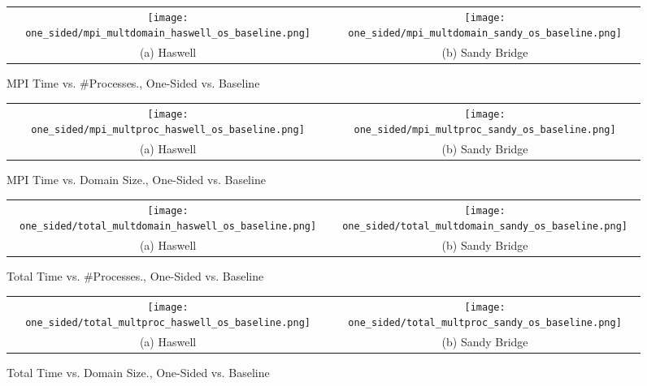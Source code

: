 \begin{enumerate}
		\begin{figure}[h] %
		\hspace*{-0.25\linewidth}\begin{tabular}{cc}
			\texttt{[image: one\_sided/mpi\_multdomain\_haswell\_os\_baseline.png]} & \texttt{[image: one\_sided/mpi\_multdomain\_sandy\_os\_baseline.png]} \\
			(a) Haswell &  (b) Sandy Bridge\\[6pt]
		\end{tabular}
		\caption{MPI Time vs. \#Processes., One-Sided vs. Baseline}
		\label{fig:mpi_multdomain_os_baseline}
	\end{figure}
	
		\begin{figure}[h] %
		\hspace*{-0.25\linewidth}\begin{tabular}{cc}
			\texttt{[image: one\_sided/mpi\_multproc\_haswell\_os\_baseline.png]} & \texttt{[image: one\_sided/mpi\_multproc\_sandy\_os\_baseline.png]} \\
			(a) Haswell &  (b) Sandy Bridge\\[6pt]
		\end{tabular}
		\caption{MPI Time vs. Domain Size., One-Sided vs. Baseline}
		\label{fig:mpi_multproc_os_baseline}
	\end{figure}
	
			\begin{figure}[h] %
		\hspace*{-0.25\linewidth}\begin{tabular}{cc}
			\texttt{[image: one\_sided/total\_multdomain\_haswell\_os\_baseline.png]} & \texttt{[image: one\_sided/total\_multdomain\_sandy\_os\_baseline.png]} \\
			(a) Haswell &  (b) Sandy Bridge\\[6pt]
		\end{tabular}
		\caption{Total Time vs. \#Processes., One-Sided vs. Baseline}
		\label{fig:total_multdomain_os_baseline}
	\end{figure}
	
		\begin{figure}[h] %
		\hspace*{-0.25\linewidth}\begin{tabular}{cc}
			\texttt{[image: one\_sided/total\_multproc\_haswell\_os\_baseline.png]} & \texttt{[image: one\_sided/total\_multproc\_sandy\_os\_baseline.png]} \\
			(a) Haswell &  (b) Sandy Bridge\\[6pt]
		\end{tabular}
		\caption{Total Time vs. Domain Size., One-Sided vs. Baseline}
		\label{fig:total_multproc_os_baseline}
	\end{figure}


\end{enumerate}
